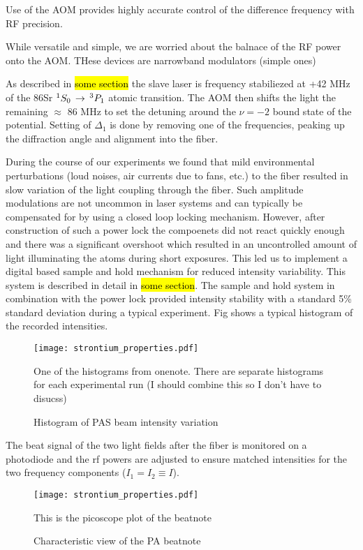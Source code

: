 Use of the AOM provides highly accurate control of the difference frequency with RF precision. 

While versatile and simple, we are worried about the balnace of the RF power onto the AOM. THese devices are narrowband modulators (simple ones) 



As described in \hl{some section} the slave laser is frequency stabiliezed at +42 MHz of the 86Sr $^1S_0\,\rightarrow\,^3P_1$ atomic transition. The AOM then shifts the light the remaining $\approx$ 86 MHz to set the detuning around the $\nu=-2$ bound state of the \intPot{\gs}{\ex} potential. 
Setting of $\Delta_1$ is done by removing one of the frequencies, peaking up the diffraction angle and alignment into the fiber. 

During the course of our experiments we found that mild environmental perturbations (loud noises, air currents due to fans, etc.) to the fiber resulted in slow variation of the light coupling through the fiber.
Such amplitude modulations are not uncommon in laser systems and can typically be compensated for by using a closed loop locking mechanism. 
However, after construction of such a power lock the compoenets did not react quickly enough and there was a significant overshoot which resulted in an uncontrolled amount of light illuminating the atoms during short exposures. 
This led us to implement a digital based sample and hold mechanism for reduced intensity variability. This system is described in detail in \hl{some section}. 
The sample and hold system in combination with the power lock provided intensity stability with a standard 5\% standard deviation during a typical experiment. 
Fig shows a typical histogram of the recorded intensities. 


\begin{figure} \label{fig:ch3_pas_histogram}
	\centerline{
	\texttt{[image: strontium\_properties.pdf]}}
	\caption{Histogram of PAS beam intensity variation}{One of the histograms from onenote. There are separate histograms for each experimental run (I should combine this so I don't have to disucss)}
\end{figure} 

The beat signal of the two light fields after the fiber is monitored on a photodiode and the rf powers are adjusted to ensure matched intensities for the two frequency components ($I_1 = I_2 \equiv I$).

\begin{figure} \label{fig:ch3_pas_light_balance}
	\centerline{
	\texttt{[image: strontium\_properties.pdf]}}
	\caption{Characteristic view of the PA beatnote}{This is the picoscope plot of the beatnote}
\end{figure} 

